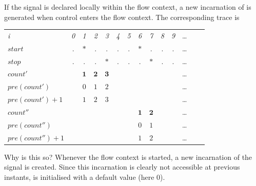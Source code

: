 If the signal  is declared locally within the flow context, a new
incarnation of  is generated when control enters the flow context.
%
%
The corresponding trace is 
\begin{center}
  \leavevmode
  \begin{tabular}[]{l@{\quad}||@{\quad}ccccccccccccc}
    \hline\hline
     \hbox{{\footnotesize \textit{i}}} &{\footnotesize \textit{0}}
     &{\footnotesize \textit{1}}&{\footnotesize \textit{2}}
     &{\footnotesize \textit{3}}&{\footnotesize \textit{4}}
     &{\footnotesize \textit{5}}&{\footnotesize \textit{6}}
     &{\footnotesize \textit{7}}&{\footnotesize \textit{8}}
     &{\footnotesize \textit{9}}&\ldots
   \\      
    \hbox{$start$} &.&$*$&.&.&.&.&$*$&.&.&.&\ldots
   \\
    \hbox{$stop$} &.&.&.&$*$&.&.&.&$*$&.&.&\ldots
   \\          
   \hbox{$count'$} &&$\mathbf{1}$&$\mathbf{2}$&$\mathbf{3}$&&&&&&&\ldots
   \\
   \hbox{$pre(count')$} &&$\mathit{0}$&$\mathit{1}$&$\mathit{2}$&&&&&&&\ldots
   \\   
   \hbox{$pre(count')+1$}   &&$\mathit{1}$&$\mathit{2}$&
   $\mathit{3}$&&&&&&&\ldots
   \\
   \hbox{$count''$} &&&&&&&$\mathbf{1}$&$\mathbf{2}$&&&\ldots
   \\  
   \hbox{$pre(count'')$} &&&&&&&$\mathit{0}$&$\mathit{1}$&&&\ldots
   \\  
   \hbox{$pre(count'')+1$} &&&&&&&$\mathit{1}$&$\mathit{2}$&&&\ldots
   \\
  \hline\hline
  \end{tabular}
\end{center}
Why is this so? Whenever
the flow context is started, a new incarnation of the signal  is created. Since this incarnation is clearly not accessible at previous instants,  is initialised with 
a default value (here $0$). 

